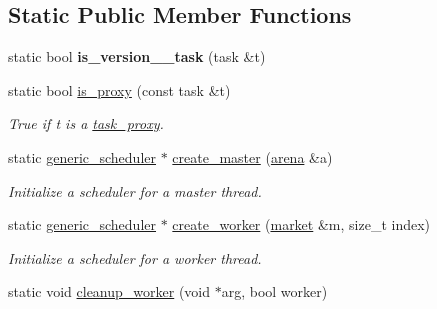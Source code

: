 \subsection*{Static Public Member Functions}
\begin{DoxyCompactItemize}
\item 
\hypertarget{classtbb_1_1internal_1_1generic__scheduler_a33519b4cf710f8c46129672f79fb6ec4}{}static bool {\bfseries is\+\_\+version\+\_\+\_\+task} (task \&t)\label{classtbb_1_1internal_1_1generic__scheduler_a33519b4cf710f8c46129672f79fb6ec4}

\item 
\hypertarget{classtbb_1_1internal_1_1generic__scheduler_a868812dd8d875a225a6f589fdbaafe54}{}static bool \hyperlink{classtbb_1_1internal_1_1generic__scheduler_a868812dd8d875a225a6f589fdbaafe54}{is\+\_\+proxy} (const task \&t)\label{classtbb_1_1internal_1_1generic__scheduler_a868812dd8d875a225a6f589fdbaafe54}

\begin{DoxyCompactList}\small\item\em True if t is a \hyperlink{structtbb_1_1internal_1_1task__proxy}{task\+\_\+proxy}. \end{DoxyCompactList}\item 
\hypertarget{classtbb_1_1internal_1_1generic__scheduler_a579b3f1a35f3e9042af02cbcc6a20d2f}{}static \hyperlink{classtbb_1_1internal_1_1generic__scheduler}{generic\+\_\+scheduler} $\ast$ \hyperlink{classtbb_1_1internal_1_1generic__scheduler_a579b3f1a35f3e9042af02cbcc6a20d2f}{create\+\_\+master} (\hyperlink{classtbb_1_1internal_1_1arena}{arena} \&a)\label{classtbb_1_1internal_1_1generic__scheduler_a579b3f1a35f3e9042af02cbcc6a20d2f}

\begin{DoxyCompactList}\small\item\em Initialize a scheduler for a master thread. \end{DoxyCompactList}\item 
\hypertarget{classtbb_1_1internal_1_1generic__scheduler_aec1108924834fb3c3e1bc0d2142bccb0}{}static \hyperlink{classtbb_1_1internal_1_1generic__scheduler}{generic\+\_\+scheduler} $\ast$ \hyperlink{classtbb_1_1internal_1_1generic__scheduler_aec1108924834fb3c3e1bc0d2142bccb0}{create\+\_\+worker} (\hyperlink{classtbb_1_1internal_1_1market}{market} \&m, size\+\_\+t index)\label{classtbb_1_1internal_1_1generic__scheduler_aec1108924834fb3c3e1bc0d2142bccb0}

\begin{DoxyCompactList}\small\item\em Initialize a scheduler for a worker thread. \end{DoxyCompactList}\item 
\hypertarget{classtbb_1_1internal_1_1generic__scheduler_ae6a0b659589202963562cbdb23465807}{}static void \hyperlink{classtbb_1_1internal_1_1generic__scheduler_ae6a0b659589202963562cbdb23465807}{cleanup\+\_\+worker} (void $\ast$arg, bool worker)\label{classtbb_1_1internal_1_1generic__scheduler_ae6a0b659589202963562cbdb23465807}


\end{DoxyCompactItemize}
